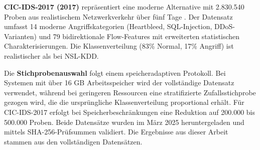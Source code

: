 \documentclass[11pt,a4paper]{article}
\begin{document}
    \textbf{CIC-IDS-2017 (2017)} repräsentiert eine moderne Alternative mit 2.830.540 Proben aus realistischem Netzwerkverkehr über fünf Tage \parencite{Sharafaldin2018}. Der Datensatz umfasst 14 moderne Angriffskategorien (Heartbleed, SQL-Injection, DDoS-Varianten) und 79 bidirektionale Flow-Features mit erweiterten statistischen Charakterisierungen. Die Klassenverteilung (83\% Normal, 17\% Angriff) ist realistischer als bei NSL-KDD.

    Die \textbf{Stichprobenauswahl} folgt einem speicheradaptiven Protokoll. Bei Systemen mit über 16 GB Arbeitsspeicher wird der vollständige Datensatz verwendet, während bei geringeren Ressourcen eine stratifizierte Zufallsstichprobe gezogen wird, die die ursprüngliche Klassenverteilung proportional erhält. Für CIC-IDS-2017 erfolgt bei Speicherbeschränkungen eine Reduktion auf 200.000 bis 500.000 Proben. Beide Datensätze wurden im März 2025 heruntergeladen und mittels SHA-256-Prüfsummen validiert. Die Ergebnisse aus dieser Arbeit stammen aus den vollständigen Datensätzen.
\end{document}
